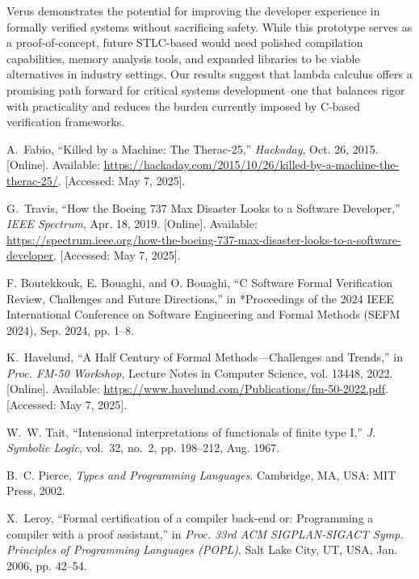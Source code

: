 \documentclass[conference]{IEEEtran}
\begin{document}
Verus demonstrates the potential for improving the developer experience in formally verified systems without sacrificing safety. While this prototype serves as a proof-of-concept, future STLC-based would need polished compilation capabilities, memory analysis tools, and expanded libraries to be viable alternatives in industry settings. Our results suggest that lambda calculus offers a promising path forward for critical systems development--one that balances rigor with practicality and reduces the burden currently imposed by C-based verification frameworks.

\begin{thebibliography}{9}

A.~Fabio, ``Killed by a Machine: The Therac-25,'' \emph{Hackaday}, Oct. 26, 2015. [Online]. Available: \url{https://hackaday.com/2015/10/26/killed-by-a-machine-the-therac-25/}. [Accessed: May 7, 2025].

G.~Travis, ``How the Boeing 737 Max Disaster Looks to a Software Developer,'' \emph{IEEE Spectrum}, Apr. 18, 2019. [Online]. Available: \url{https://spectrum.ieee.org/how-the-boeing-737-max-disaster-looks-to-a-software-developer}. [Accessed: May 7, 2025].

F. Boutekkouk, E. Bouaghi, and O. Bouaghi, “C Software Formal Verification Review, Challenges and Future Directions,” in *Proceedings of the 2024 IEEE International Conference on Software Engineering and Formal Methods (SEFM 2024), Sep. 2024, pp. 1–8.

K.~Havelund, “A Half Century of Formal Methods—Challenges and Trends,” in \emph{Proc. FM-50 Workshop}, Lecture Notes in Computer Science, vol. 13448, 2022. [Online]. Available: \url{https://www.havelund.com/Publications/fm-50-2022.pdf}. [Accessed: May 7, 2025].

W.~W. Tait, “Intensional interpretations of functionals of finite type I,” \emph{J. Symbolic Logic}, vol.~32, no.~2, pp. 198–212, Aug. 1967.

B.~C. Pierce, \emph{Types and Programming Languages}. Cambridge, MA, USA: MIT Press, 2002.

X.~Leroy, “Formal certification of a compiler back-end or: Programming a compiler with a proof assistant,” in \emph{Proc. 33rd ACM SIGPLAN-SIGACT Symp. Principles of Programming Languages (POPL)}, Salt Lake City, UT, USA, Jan. 2006, pp. 42–54.


\end{thebibliography}
\end{document}
